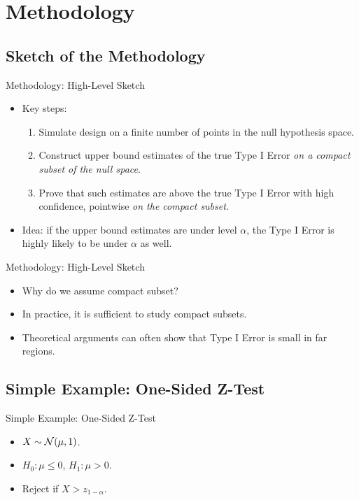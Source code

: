 \section{Methodology}
\frame{\tableofcontents[currentsection]}

\subsection{Sketch of the Methodology}

\begin{frame}{Methodology: High-Level Sketch}
\begin{itemize}
    \item Key steps:
    \begin{enumerate}
    \item Simulate design on a finite number of points
    in the null hypothesis space.
    \item Construct upper bound estimates of the true Type I Error
    \emph{on a compact subset of the null space}.
    \item Prove that such estimates are above the true Type I Error
    with high confidence, pointwise \emph{on the compact subset}.
    \end{enumerate}
    
    \item Idea: if the upper bound estimates are under level $\alpha$,
    the Type I Error is highly likely to be under $\alpha$ as well.
\end{itemize}
\end{frame}

\begin{frame}{Methodology: High-Level Sketch}
\begin{itemize}
    \item Why do we assume compact subset? 
    \item In practice, it is sufficient to study compact subsets.
    \item Theoretical arguments can often show that Type I Error is small in far regions.
\end{itemize}
\end{frame}

\subsection{Simple Example: One-Sided Z-Test}

\begin{frame}{Simple Example: One-Sided Z-Test}
\begin{itemize}
    \item $X \sim \mathcal{N}(\mu, 1)$.
    \item $H_0: \mu \leq 0$, $H_1: \mu > 0$.
    \item Reject if $X > z_{1-\alpha}$.
\end{itemize}
\end{frame}

